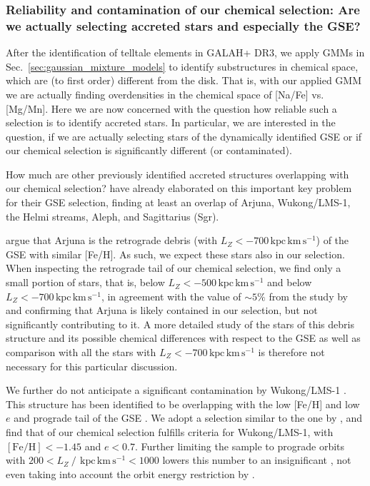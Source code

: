 \documentclass[fleqn,usenatbib]{mnras}
\newcommand{\kpckms}{\,\mathrm{kpc\,km\,s^{-1}}}	%
\begin{document}
\subsubsection{Reliability and contamination of our chemical selection: Are we actually selecting accreted stars and especially the GSE?} \label{sec:reliability_selection}

After the identification of telltale elements in GALAH+ DR3, we apply GMMs in Sec.~\ref{sec:gaussian_mixture_models} to identify substructures in chemical space, which are (to first order) different from the disk. That is, with our applied GMM we are actually finding overdensities in the chemical space of [Na/Fe] vs. [Mg/Mn]. Here we are now concerned with the question how reliable such a selection is to identify accreted stars. In particular, we are interested in the question, if we are actually selecting stars of the dynamically identified GSE or if our chemical selection is significantly different (or contaminated).

How much are other previously identified accreted structures overlapping with our chemical selection? \citet{Naidu2020} have already elaborated on this important key problem for their GSE selection, finding at least an overlap of Arjuna, Wukong/LMS-1, the Helmi streams, Aleph, and Sagittarius (Sgr).

\citet{Naidu2021} argue that Arjuna is the retrograde debris (with $L_Z < -700 \kpckms$) of the GSE with similar [Fe/H]. As such, we expect these stars also in our selection. When inspecting the retrograde tail of our chemical selection, we find only a small portion of stars, that is,  below $L_Z < -500 \kpckms$ and  below $L_Z < -700 \kpckms$, in agreement with the value of $\sim 5\%$ from the study by \citet{Naidu2021} and confirming that Arjuna is likely contained in our selection, but not significantly contributing to it. A more detailed study of the  stars of this debris structure and its possible chemical differences with respect to the GSE as well as comparison with all the  stars with $L_Z < -700 \kpckms$ is therefore not necessary for this particular discussion.

We further do not anticipate a significant contamination by Wukong/LMS-1 \citep{Yuan2020a, Naidu2020}. This structure has been identified to be overlapping with the low [Fe/H] and low $e$ and prograde tail of the GSE \citep{Naidu2020}. We adopt a selection similar to the one by \citet{Naidu2020}, and find that  of our chemical selection fulfills criteria for Wukong/LMS-1, with $\mathrm{[Fe/H]} < -1.45$ and $e < 0.7$. Further limiting the sample to prograde orbits with $200 < L_Z~/~\kpckms < 1000$ lowers this number to an insignificant , not even taking into account the orbit energy restriction by \citet{Naidu2020}.
\end{document}
